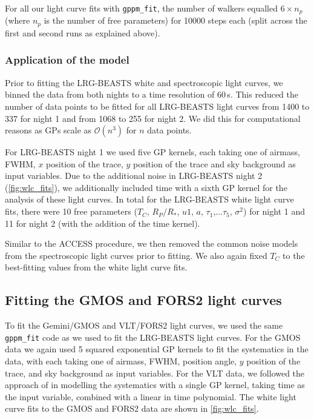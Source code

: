 \documentclass[twocolumn]{aastex63}
\newcommand{\gppmfit}{\texttt{gppm\_fit}}
\begin{document}
For all our light curve fits with \gppmfit{}, the number of walkers equalled $6\times n_p$ (where $n_p$ is the number of free parameters) for 10000 steps each (split across the first and second runs as explained above).

\subsubsection{Application of the model}

Prior to fitting the LRG-BEASTS white and spectroscopic light curves, we binned the data from both nights to a time resolution of 60\,s. This reduced the number of data points to be fitted for all LRG-BEASTS light curves from 1400 to 337 for night 1 and from 1068 to 255 for night 2. We did this for computational reasons as GPs scale as $\mathcal{O}(n^3)$ for $n$ data points. 

For LRG-BEASTS night 1 we used five GP kernels, each taking one of airmass, FWHM, $x$ position of the trace, $y$ position of the trace and sky background as input variables. Due to the additional noise in LRG-BEASTS night 2 (\autoref{fig:wlc_fits}), we additionally included time with a sixth GP kernel for the analysis of these light curves. In total for the LRG-BEASTS white light curve fits, there were 10 free parameters ($T_C$, $R_P/R_*$, $u1$, $a$, $\tau_1$,...$\tau_5$, $\sigma^2$) for night 1 and 11 for night 2 (with the addition of the time kernel).

Similar to the ACCESS procedure, we then removed the common noise models from the spectroscopic light curves prior to fitting. We also again fixed $T_C$ to the best-fitting values from the white light curve fits.

\subsection{Fitting the GMOS and FORS2 light curves}

To fit the Gemini/GMOS and VLT/FORS2 light curves, we used the same \gppmfit{} code as we used to fit the LRG-BEASTS light curves.
For the GMOS data we again used 5 squared exponential GP kernels to fit the systematics in the data, with each taking one of airmass, FWHM, position angle, $y$ position of the trace, and sky background as input variables.
For the VLT data, we followed the approach of \cite{Wilson2020} in modelling the systematics with a single GP kernel, taking time as the input variable, combined with a linear in time polynomial.
The white light curve fits to the GMOS and FORS2 data are shown in \autoref{fig:wlc_fits}.
\end{document}
